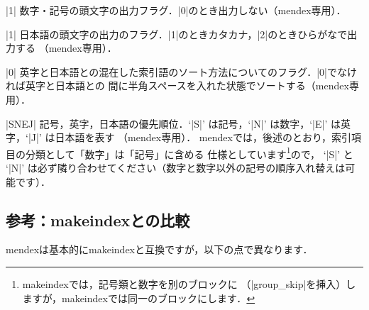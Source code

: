 \documentclass[a4paper]{jsarticle}
\newcommand{\SoftName}[1]{\textsf{#1}}
\begin{document}
\begin{description}[leftmargin=3.5cm]
\item[|symbol\string_flag|] \ParamNum|1|
数字・記号の頭文字の出力フラグ．|0|のとき出力しない（\SoftName{mendex}専用）．

\item[|letter\string_head|] \ParamNum|1|
日本語の頭文字の出力のフラグ．|1|のときカタカナ，|2|のときひらがなで出力する
（\SoftName{mendex}専用）．

\item[|priority|] \ParamNum|0|
英字と日本語との混在した索引語のソート方法についてのフラグ．|0|でなければ英字と日本語との
間に半角スペースを入れた状態でソートする（\SoftName{mendex}専用）．

\item[|character\string_order|] \ParamString*|SNEJ|
記号，英字，日本語の優先順位．`|S|' は記号，`|N|' は数字，`|E|' は英字，`|J|' は日本語を表す
（\SoftName{mendex}専用）．
\SoftName{mendex}では，後述のとおり，索引項目の分類として「数字」は「記号」に含める
仕様としています\footnote{\SoftName{makeindex}では，記号類と数字を別のブロックに
（|group\_skip|を挿入）しますが，\SoftName{makeindex}では同一のブロックにします．}ので，
`|S|' と `|N|' は必ず隣り合わせてください（数字と数字以外の記号の順序入れ替えは可能です）．
\end{description}

\subsection{参考：\SoftName{makeindex}との比較}
\SoftName{mendex}は基本的に\SoftName{makeindex}と互換ですが，以下の点で異なります．
\end{document}
